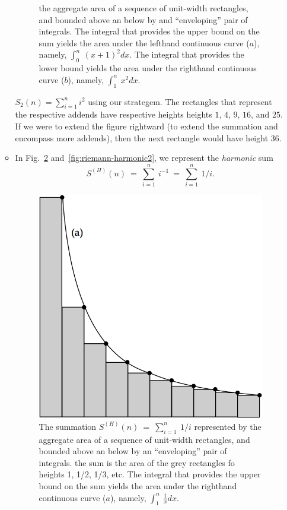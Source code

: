 \begin{enumerate}
\begin{itemize}
\begin{figure}[htb]
{  the aggregate area of a sequence of unit-width rectangles, and
  bounded above an below by and ``enveloping'' pair of integrals.  The
  integral that provides the upper bound on the sum yields the area
  under the lefthand continuous curve ($a$), namely, $\int_0^n
  \ (x+1)^2 dx$.  The integral that provides the lower bound yields
  the area under the righthand continuous curve ($b$), namely,
  $\int_1^n \ x^2 dx$.}
\label{fig:riemann-n2}
\end{figure}
$S_2(n) = \sum_{i=1}^n  i^2$ using our strategem.  The rectangles
that represent the respective addends have respective heights heights
$1$, $4$, $9$, $16$, and $25$.  If we were to extend the figure
rightward (to extend the summation and encompass more addends), then
the next rectangle would have height $36$.

\item
In Fig.~\ref{fig:riemann-harmonic1} and~\ref{fig:riemann-harmonic2}, we represent the {\em harmonic} sum
\[ S^{(H)}(n) \ = \ \sum_{i=1}^n \ i^{-1} \ = \ \sum_{i=1}^n \ 1/i.
\]
\begin{figure}[htb]
\centerline{
\includegraphics[scale=0.3]{FiguresMaths/RiemannSum1}
}
\caption{The summation $S^{(H)}(n) \ = \ \sum_{i=1}^n \ 1/i$
  represented by the aggregate area of a sequence of unit-width
  rectangles, and bounded above an below by an ``enveloping'' pair of
  integrals.  
  {\Denis the sum is the area of the grey rectangles fo heights 1, 1/2, 1/3, etc.}
  The integral that provides the upper bound on the sum
  yields the area under the righthand continuous curve ($a$), namely,
  $\displaystyle \int_1^n \ \frac{1}{x} dx$. }
\label{fig:riemann-harmonic1}
\end{figure}


\end{itemize}
\end{enumerate}
